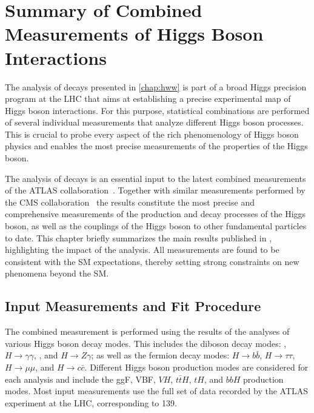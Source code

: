 \chapter[Combined Higgs Boson Measurements]{Summary of Combined Measurements of Higgs Boson Interactions}
\label{chap:comb}
The analysis of \HWW decays presented in \cref{chap:hww} is part of a broad Higgs precision program at the LHC that aims at establishing a precise experimental map of Higgs boson interactions.
For this purpose, statistical combinations are performed of several individual measurements that analyze different Higgs boson processes.
This is crucial to probe every aspect of the rich phenomenology of Higgs boson physics and enables the most precise measurements of the properties of the Higgs boson. 

The analysis of \HWW decays is an essential input to the latest combined measurements of the ATLAS collaboration~\cite{NaturePaper}.
Together with similar measurements performed by the CMS collaboration~\cite{CMSNaturePaper} the results constitute the most precise and comprehensive measurements of the production and decay processes of the Higgs boson, as well as the couplings of the Higgs boson to other fundamental particles to date.
This chapter briefly summarizes the main results published in , highlighting the impact of the \HWW analysis.
All measurements are found to be consistent with the SM expectations, thereby setting strong constraints on new phenomena beyond the SM.  

\section{Input Measurements and Fit Procedure}
The combined measurement is performed using the results of the analyses of various Higgs boson decay modes.
This includes the diboson decay modes: \HZZ, $H \to \gamma\gamma$, \HWW, and $H \to Z\gamma$; as well as the fermion decay modes: $H \to b\bar{b}$, $H \to \tau\tau$, $H \to \mu\mu$, and $H \to c\bar{c}$. 
Different Higgs boson production modes are considered for each analysis and include the ggF, VBF, $VH$, $t\bar{t}H$, $tH$, and $bbH$ production modes. 
Most input measurements use the full set of \RunTwo data recorded by the ATLAS experiment at the LHC, corresponding to 139\ifb.

